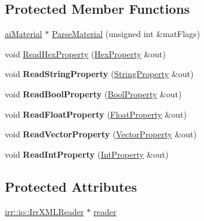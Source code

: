 \subsection*{Protected Member Functions}
\begin{DoxyCompactItemize}
\item 
\hyperlink{classai_material}{ai\+Material} $\ast$ \hyperlink{class_assimp_1_1_irrlicht_base_abb02caad9a1263c492e895b70aa46ca0}{Parse\+Material} (unsigned int \&mat\+Flags)
\item 
void \hyperlink{class_assimp_1_1_irrlicht_base_a3e4c34a680b92161f497322055a10831}{Read\+Hex\+Property} (\hyperlink{struct_assimp_1_1_irrlicht_base_1_1_property}{Hex\+Property} \&out)
\item 
\hypertarget{class_assimp_1_1_irrlicht_base_a462146b240583a27a66fbe165e3296d5}{void {\bfseries Read\+String\+Property} (\hyperlink{struct_assimp_1_1_irrlicht_base_1_1_property}{String\+Property} \&out)}\label{class_assimp_1_1_irrlicht_base_a462146b240583a27a66fbe165e3296d5}

\item 
\hypertarget{class_assimp_1_1_irrlicht_base_a9b91e3bb04c49cadfba34ed530187bb1}{void {\bfseries Read\+Bool\+Property} (\hyperlink{struct_assimp_1_1_irrlicht_base_1_1_property}{Bool\+Property} \&out)}\label{class_assimp_1_1_irrlicht_base_a9b91e3bb04c49cadfba34ed530187bb1}

\item 
\hypertarget{class_assimp_1_1_irrlicht_base_a3c0ff95c5e1b21c4c741dcc3f203c5ab}{void {\bfseries Read\+Float\+Property} (\hyperlink{struct_assimp_1_1_irrlicht_base_1_1_property}{Float\+Property} \&out)}\label{class_assimp_1_1_irrlicht_base_a3c0ff95c5e1b21c4c741dcc3f203c5ab}

\item 
\hypertarget{class_assimp_1_1_irrlicht_base_ac5723a6f696b395fb357fe5a45bc111b}{void {\bfseries Read\+Vector\+Property} (\hyperlink{struct_assimp_1_1_irrlicht_base_1_1_property}{Vector\+Property} \&out)}\label{class_assimp_1_1_irrlicht_base_ac5723a6f696b395fb357fe5a45bc111b}

\item 
\hypertarget{class_assimp_1_1_irrlicht_base_a0ce4d98ce3b26e2a209bc5317578bf17}{void {\bfseries Read\+Int\+Property} (\hyperlink{struct_assimp_1_1_irrlicht_base_1_1_property}{Int\+Property} \&out)}\label{class_assimp_1_1_irrlicht_base_a0ce4d98ce3b26e2a209bc5317578bf17}

\end{DoxyCompactItemize}
\subsection*{Protected Attributes}
\begin{DoxyCompactItemize}
\item 
\hyperlink{classirr_1_1io_1_1_i_irr_x_m_l_reader}{irr\+::io\+::\+Irr\+X\+M\+L\+Reader} $\ast$ \hyperlink{class_assimp_1_1_irrlicht_base_abdb1f05a9b91a51d753b500af4a9053d}{reader}
\end{DoxyCompactItemize}


